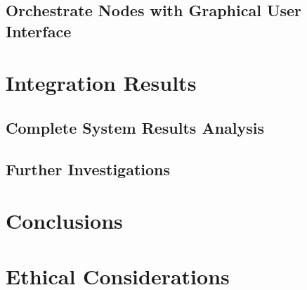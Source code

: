\documentclass[11pt]{report} %
\begin{document}
\section{Orchestrate Nodes with Graphical User Interface}

\chapter{Integration Results}

\section{Complete System Results Analysis}

\section{Further Investigations}

\chapter{Conclusions}

\chapter{Ethical Considerations}



\begin{sloppypar}
    
    
\end{sloppypar}
\end{document}
